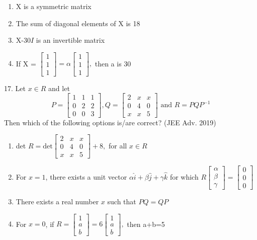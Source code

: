 \documentclass[journal,12pt,twocolumn]{IEEEtran}
\theoremstyle{remark}
\begin{document}
\begin{enumerate}
	\item X is a symmetric matrix
	\item The sum of diagonal elements of X is 18
	\item X-30$I$ is an invertible matrix
	\item If X = $\begin{bmatrix}1\\1\\1\end{bmatrix}=\alpha\begin{bmatrix}1\\1\\1\end{bmatrix},$ then a is 30\\[2pt]
\end{enumerate}

17. Let $x\in R$ and let
$$P = \begin{bmatrix}1&1&1\\0&2&2\\0&0&3\end{bmatrix},Q = \begin{bmatrix}2&x&x\\0&4&0\\x&x&5\end{bmatrix} \text{ and }R=PQP^{-1}$$
Then which of the following options is/are correct? \hfill (JEE Adv. 2019)


\begin{enumerate}
		\item det $R = \text{det}\begin{bmatrix}2&x&x\\0&4&0\\x&x&5\end{bmatrix}+8,$ for all $x\in R$
		\item For $x=1$, there exists a unit vector $\alpha\hat{i}+\beta\hat{j}+\gamma\hat{k}$ for which $R\begin{bmatrix}\alpha\\\beta\\\gamma\end{bmatrix}=\begin{bmatrix}0\\0\\0\end{bmatrix}$
		\item There exists a real number $x$ such that $PQ = QP$
		\item For $x=0$, if $R=\begin{bmatrix}1\\a\\b\end{bmatrix}=6\begin{bmatrix}1\\a\\b\end{bmatrix},$ then a+b=5\\[2pt]
\end{enumerate}
\end{document}
